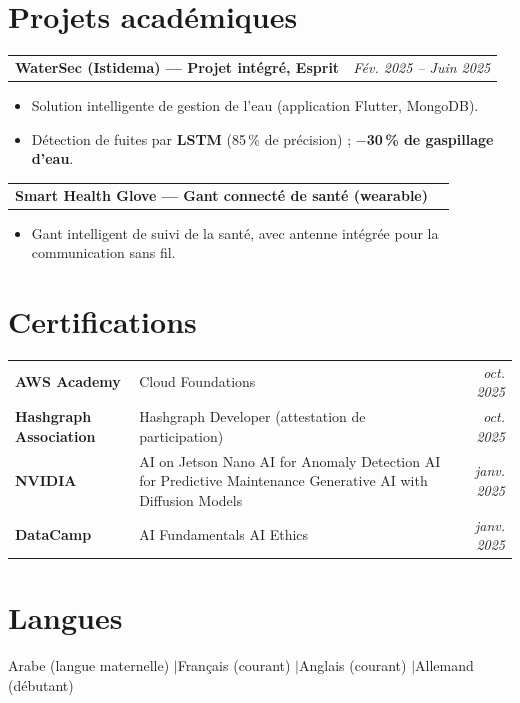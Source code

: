 \documentclass[10pt,a4paper]{article}
\makeatletter
\newcommand{\cvhead}[2]{%
  \noindent\begin{tabularx}{\linewidth}{@{}X r@{}}
    \textbf{#1} & \textit{\small #2}\\
  \end{tabularx}\vspace{1pt}%
}
\makeatother
\begin{document}
\section{Projets académiques}

\cvhead{WaterSec (Istidema) --- Projet intégré, Esprit}{Fév. 2025 -- Juin 2025}
\begin{itemize}
  \item Solution intelligente de gestion de l'eau (application Flutter, MongoDB).
  \item Détection de fuites par \textbf{LSTM} (85\,\% de précision) ; \textbf{$-$30\,\% de gaspillage d'eau}.
\end{itemize}

\cvhead{Smart Health Glove --- Gant connecté de santé (wearable)}{}
\begin{itemize}
  \item Gant intelligent de suivi de la santé, avec antenne intégrée pour la communication sans fil.
\end{itemize}


\section{Certifications}
\noindent\begin{tabularx}{\linewidth}{@{}>{\bfseries}p{5.2cm}X>{\itshape\small}r@{}}
  AWS Academy           & \small Cloud Foundations & oct. 2025 \\[2pt]
  Hashgraph Association & \small Hashgraph Developer (attestation de participation) & oct. 2025 \\[2pt]
  NVIDIA                & \small AI on Jetson Nano \textbullet{} AI for Anomaly Detection \textbullet{} AI for Predictive Maintenance \textbullet{} Generative AI with Diffusion Models & janv. 2025 \\[2pt]
  DataCamp              & \small AI Fundamentals \textbullet{} AI Ethics & janv. 2025 \\
\end{tabularx}

\section{Langues}
\small Arabe (langue maternelle) \quad$|$\quad Français (courant) \quad$|$\quad Anglais (courant) \quad$|$\quad Allemand (débutant)
\end{document}
